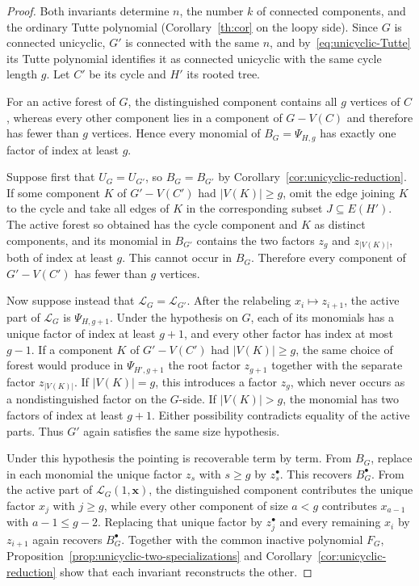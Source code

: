 \documentclass[11pt]{article}
\theoremstyle{plain}
\theoremstyle{definition}
\renewcommand{\mathcal}{\mathscr}
\newcommand{\LL}{\mathcal{L}}    %
\newcommand{\bx}{\mathbf{x}}
\numberwithin{equation}{section}
\begin{document}
\begin{proof}
Both invariants determine $n$, the number $k$ of connected components, and the
ordinary Tutte polynomial (Corollary~\ref{th:cor} on the loopy side).
Since $G$ is connected unicyclic, $G'$ is connected with the same $n$, and
by~\eqref{eq:unicyclic-Tutte} its Tutte polynomial identifies it as connected
unicyclic with the same cycle length $g$.  Let $C'$ be its cycle and $H'$ its rooted tree.

For an active forest of $G$, the distinguished component contains all $g$
vertices of $C$, whereas every other component lies in a component of
$G-V(C)$ and therefore has fewer than $g$ vertices.  Hence every monomial of
$B_G=\Psi_{H,g}$ has exactly one factor of index at least $g$.

Suppose first that $U_G=U_{G'}$, so $B_G=B_{G'}$ by Corollary~\ref{cor:unicyclic-reduction}.
If some component $K$ of $G'-V(C')$ had $|V(K)|\ge g$, omit the edge joining $K$ to the cycle
and take all edges of $K$ in the corresponding subset $J\subseteq E(H')$.  The active
forest so obtained has the cycle component and $K$ as distinct components,
and its monomial in $B_{G'}$ contains the two factors $z_g$ and
$z_{|V(K)|}$, both of index at least $g$.  This cannot occur in $B_G$.
Therefore every component of $G'-V(C')$ has fewer than $g$ vertices.

Now suppose instead that $\LL_G=\LL_{G'}$.
After the relabeling $x_i\mapsto z_{i+1}$, the active part of $\LL_G$ is $\Psi_{H,g+1}$.
Under the hypothesis on $G$, each of its monomials has a unique factor of index at
least $g+1$, and every other factor has index at most $g-1$.
If a component $K$ of $G'-V(C')$ had $|V(K)|\ge g$, the same choice of forest would produce
in $\Psi_{H',g+1}$ the root factor $z_{g+1}$ together with the separate
factor $z_{|V(K)|}$.  If $|V(K)|=g$, this introduces a factor $z_g$, which
never occurs as a nondistinguished factor on the $G$-side. If $|V(K)|>g$,
the monomial has two factors of index at least $g+1$.  Either possibility
contradicts equality of the active parts.
Thus $G'$ again satisfies the same size hypothesis.

Under this hypothesis the pointing is recoverable term by term.  From
$B_G$, replace in each monomial the unique factor $z_s$ with $s\ge g$ by
$z_s^\bullet$.  This recovers $B_G^\bullet$.  From the active part of
$\LL_G(1,\bx)$, the distinguished component contributes the unique factor
$x_j$ with $j\ge g$, while every other component of size $a<g$ contributes
$x_{a-1}$ with $a-1\le g-2$.  Replacing that unique factor by $z_j^\bullet$
and every remaining $x_i$ by $z_{i+1}$ again recovers $B_G^\bullet$.
Together with the common inactive polynomial $F_G$, Proposition~\ref{prop:unicyclic-two-specializations}
and Corollary~\ref{cor:unicyclic-reduction} show that each invariant reconstructs the other.
\end{proof}
\end{document}
